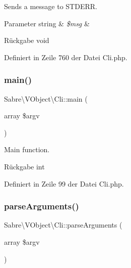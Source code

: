 Sends a message to S\+T\+D\+E\+RR.


\begin{DoxyParams}[1]{Parameter}
string & {\em \$msg} & \\
\hline
\end{DoxyParams}
\begin{DoxyReturn}{Rückgabe}
void 
\end{DoxyReturn}


Definiert in Zeile 760 der Datei Cli.\+php.

\mbox{\label{class_sabre_1_1_v_object_1_1_cli_a5e13b470e33895afb366b1373d5365c2}} 
\subsubsection{\texorpdfstring{main()}{main()}}
{\footnotesize\ttfamily Sabre\textbackslash{}\+V\+Object\textbackslash{}\+Cli\+::main (\begin{DoxyParamCaption}\item[{array}]{\$argv }\end{DoxyParamCaption})}

Main function.

\begin{DoxyReturn}{Rückgabe}
int 
\end{DoxyReturn}


Definiert in Zeile 99 der Datei Cli.\+php.

\mbox{\label{class_sabre_1_1_v_object_1_1_cli_a1dd6fc8d2dcd430f915df78e9f7cff74}} 
\subsubsection{\texorpdfstring{parse\+Arguments()}{parseArguments()}}
{\footnotesize\ttfamily Sabre\textbackslash{}\+V\+Object\textbackslash{}\+Cli\+::parse\+Arguments (\begin{DoxyParamCaption}\item[{array}]{\$argv }\end{DoxyParamCaption})\hspace{0.3cm}{\ttfamily [protected]}}

